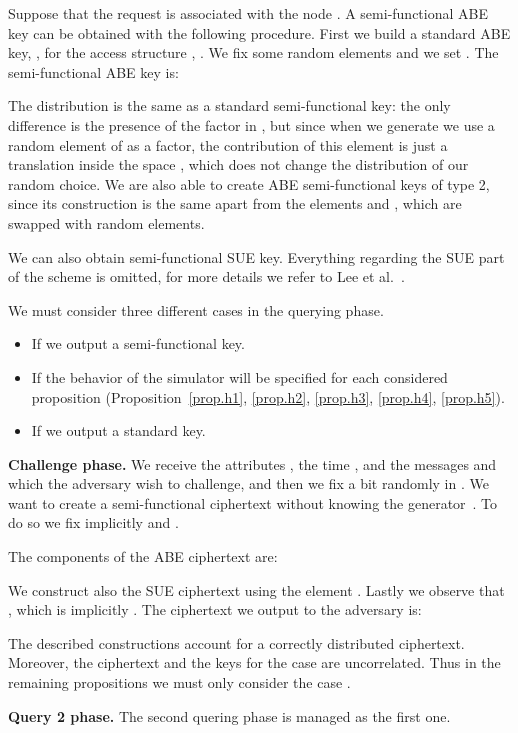 \documentclass[a4paper,10pt]{article}
\newcommand{\phase}[1]{\textbf{#1 phase.} \hspace{0pt}}
\begin{document}
	Suppose that the request is associated with the node .
	A semi-functional ABE key can be obtained with the following procedure. First we build a standard ABE key, , for the access structure , .
	We fix some random elements  and we set . 
	The semi-functional ABE key is:
	
	The distribution is the same as a standard semi-functional key: the only difference is the presence of the factor  in , but since when we generate  we use a random element of  as a factor, the contribution of this element is just a translation inside the space , which does not change the distribution of our random choice.
	We are also able to create ABE semi-functional keys of type 2, since its construction is the same apart from the elements  and , which are swapped with random elements.
	
	We can also obtain semi-functional SUE key. Everything regarding the SUE part of the scheme is omitted, for more details we refer to Lee et al.~\cite{lee2013RSABE}.
	
	We must consider three different cases in the querying phase.
	\begin{itemize}
		\item
		If  we output a semi-functional key.
		\item
		If  the behavior of the simulator will be specified for each considered proposition (Proposition~\ref{prop.h1}, \ref{prop.h2}, \ref{prop.h3}, \ref{prop.h4}, \ref{prop.h5}).
		\item
		If  we output a standard key.
	\end{itemize}
	
	\phase{Challenge}
	We receive the attributes , the time , and the messages  and  which the adversary wish to challenge, and then we fix a bit  randomly in .
	We want to create a semi-functional ciphertext without knowing the generator~.
	To do so we fix implicitly  and .
	
	The components of the ABE ciphertext are:
		
		
	We construct also the SUE ciphertext  using the element .
	Lastly we observe that , which is implicitly .
	The ciphertext we output to the adversary  is:
	
	
	The described constructions account for a correctly distributed ciphertext. Moreover, the ciphertext and the keys for the case  are uncorrelated. Thus in the remaining propositions we must only consider the case .
		
	\phase{Query 2}
	The second quering phase is managed as the first one.
	
\end{document}
